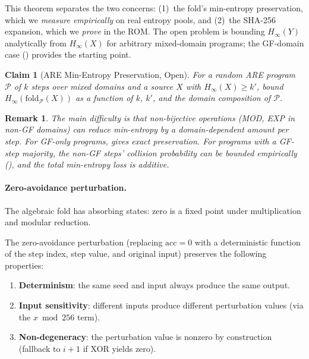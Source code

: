 \documentclass[sigconf,anonymous,review]{acmart}
\theoremstyle{acmdefinition}%
\newtheorem{claim}[theorem]{Claim}%
\newtheorem*{remark}{Remark}%
\theoremstyle{acmplain}%
\newcommand{\are}{\textsc{ARE}\xspace}
\newcommand{\minentropy}{H_{\infty}}
\begin{document}
This theorem separates the two concerns: (1)~the fold's min-entropy preservation, which we \emph{measure empirically} on real entropy pools, and (2)~the SHA-256 expansion, which we \emph{prove} in the ROM.
The open problem is bounding $\minentropy(Y)$ analytically from $\minentropy(X)$ for arbitrary mixed-domain programs; the GF-domain case () provides the starting point.

\begin{claim}[ARE Min-Entropy Preservation, Open]
\label{claim:are-extraction}
For a random \are program $\mathcal{P}$ of $k$ steps over mixed domains and a source $X$ with $\minentropy(X) \geq k'$, bound $\minentropy(\mathrm{fold}_{\mathcal{P}}(X))$ as a function of $k$, $k'$, and the domain composition of $\mathcal{P}$.
\end{claim}

\begin{remark}
The main difficulty is that non-bijective operations (MOD, EXP in non-GF domains) can reduce min-entropy by a domain-dependent amount per step.
For GF-only programs,  gives exact preservation.
For programs with a GF-step majority, the non-GF steps' collision probability can be bounded empirically (), and the total min-entropy loss is additive.
\end{remark}

\paragraph{Zero-avoidance perturbation.}
The algebraic fold has absorbing states: zero is a fixed point
under multiplication and modular reduction.

\begin{lemma}
\label{lem:zero-avoid}
The zero-avoidance perturbation (replacing $\mathrm{acc} = 0$ with
a deterministic function of the step index, step value, and
original input) preserves the following properties:
\begin{enumerate}
  \item \textbf{Determinism}: the same seed and input always
    produce the same output.
  \item \textbf{Input sensitivity}: different inputs produce
    different perturbation values (via the $x \bmod 256$ term).
  \item \textbf{Non-degeneracy}: the perturbation value is nonzero
    by construction (fallback to $i+1$ if XOR yields zero).
\end{enumerate}
\end{lemma}
\end{document}
